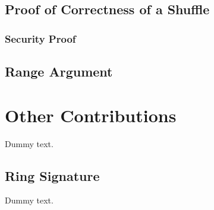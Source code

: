     \section{Proof of Correctness of a Shuffle}

        

        \subsection{Security Proof}

            

    \section{Range Argument}

        

\chapter{Other Contributions}

    Dummy text.

    \section{Ring Signature}

Dummy text.
